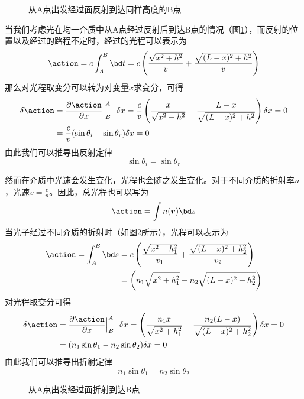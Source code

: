\documentclass[12pt,openany]{book}
\begin{document}
\begin{figure}
   \centering 

\label{fig:refl}
\caption{从A点出发经过面反射到达同样高度的B点}
\end{figure}
当我们考虑光在均一介质中从A点经过反射后到达B点的情况（图\ref{fig:refl}），而反射的位置以及经过的路程不定时，经过的光程可以表示为
\begin{equation}
   \action = c\int_A^B \bd t = c\left(\frac{\sqrt{x^2 + h^2}}{v} + \frac{\sqrt{(L-x)^2+h^2}}{v} \right)
\end{equation}
那么对光程取变分可以转为对变量$x$求变分，可得
\begin{equation}
   \begin{split}
   \delta\action &=\frac{\partial\action}{\partial x}\Big|^A_B ~~\delta x = \frac{c}{v}\left( \frac{x}{\sqrt{x^2 + h^2}} - \frac{L-x}{\sqrt{(L-x)^2+h^2}} \right)\delta x=0
   \\&=\frac{c}{v}(\sin\theta_i - \sin\theta_r)\delta x=0
   \end{split}
\end{equation}
由此我们可以推导出反射定律
\begin{equation}
   \sin\theta_i = \sin\theta_r
\end{equation}


然而在介质中光速会发生变化，光程也会随之发生变化。对于不同介质的折射率\(n\)，光速\(v=\frac{c}{n}\)。因此，总光程也可以写为
\begin{equation}
   \action = \int n(\boldsymbol{r})\bd s\label{eq:fermat_n}
\end{equation}
当光子经过不同介质的折射时（如图\ref{fig:refr}所示），光程可以表示为
\begin{equation}
   \begin{split}
   \action = \int_A^B \bd s &= c\left(\frac{\sqrt{x^2 + h_1^2}}{v_1} + \frac{\sqrt{(L-x)^2+h_2^2}}{v_2} \right) \\&= \left(n_1{\sqrt{x^2 + h_1^2}} + n_2{\sqrt{(L-x)^2+h_2^2}} \right)
   \end{split}
\end{equation}
对光程取变分可得
\begin{equation}
   \begin{split}
   \delta\action &=\frac{\partial\action}{\partial x}\Big|^A_B ~~\delta x = \left( \frac{n_1 x}{\sqrt{x^2 + h_1^2}} - \frac{n_2 (L-x)}{\sqrt{(L-x)^2+h_2^2}} \right)\delta x=0
   \\&= (n_1\sin\theta_1 - n_2\sin\theta_2)\delta x=0
   \end{split}
\end{equation}
由此我们可以推导出折射定律
\begin{equation}
   n_1\sin\theta_1 = n_2\sin\theta_2
\end{equation}
\begin{figure}
   \centering
\label{fig:refr}
\caption{从A点出发经过面折射到达B点}
\end{figure}
\end{document}
